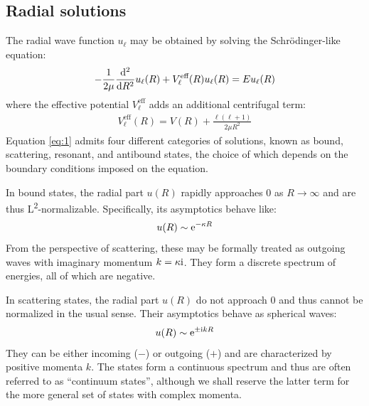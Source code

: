\documentclass[amsmath, amssymb, aps, floatfix, nofootinbib, preprintnumbers,
  showpacs, superscriptaddress, twocolumn]{revtex4-1}
\begin{document}
\subsection{Radial solutions}

The radial wave function $u_\ell$ may be obtained by solving the
Schr\"odinger-like equation:\cite{Thompson2009}
\begin{align} \label{eq:1}
  -\frac{1}{2 \mu} \frac{\operatorname{d \!}\mathord{}^2}{\operatorname{d \!}\mathord{} R^2} u_\ell(R)
  + V_\ell^{\text{eff}}(R) u_\ell(R)
  = E u_\ell(R)
\end{align}
where the effective potential $V_\ell^{\text{eff}}$ adds an additional
centrifugal term:
\begin{align*}
  V_\ell^{\text{eff}}(R) = V(R) + \frac{\ell (\ell + 1)}{2 \mu R^2}
\end{align*}
Equation \eqref{eq:1} admits four different categories of solutions, known as
bound, scattering, resonant, and antibound states, the choice of which depends
on the boundary conditions imposed on the equation.

In bound states, the radial part $u(R)$ rapidly approaches $0$ as
$R \to \infty$ and are thus L\textsuperscript{2}-normalizable.  Specifically, its
asymptotics behave like:
\begin{align*}
  u(R) \sim \mathrm e^{-\kappa R}
\end{align*}
From the perspective of scattering, these may be formally treated as outgoing
waves with imaginary momentum $k = \kappa \mathrm{i}$.  They form a discrete spectrum
of energies, all of which are negative.

In scattering states, the radial part $u(R)$ do not approach $0$ and thus
cannot be normalized in the usual sense.  Their asymptotics behave as
spherical waves:
\begin{align*}
  u(R) \sim \mathrm e^{\pm \mathrm{i} k R}
\end{align*}
They can be either incoming ($-$) or outgoing ($+$) and are characterized by
positive momenta $k$.  The states form a continuous spectrum and thus are
often referred to as ``continuum states'', although we shall reserve the
latter term for the more general set of states with complex momenta.
\end{document}
